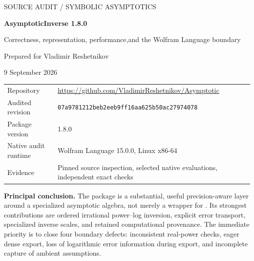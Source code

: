 \documentclass[11pt,a4paper]{article}
\newcommand{\code}[1]{\texttt{\detokenize{#1}}}
\begin{document}
\begin{titlepage}
\vspace*{17mm}
{\sffamily\large SOURCE AUDIT \; / \; SYMBOLIC ASYMPTOTICS\par}
\vspace{10mm}
{\sffamily\bfseries\fontsize{29}{34}\selectfont AsymptoticInverse 1.8.0\par}
\vspace{5mm}
{\sffamily\fontsize{18}{24}\selectfont Correctness, representation, performance,\newline and the Wolfram Language boundary\par}
\vspace{15mm}
{\large Prepared for Vladimir Reshetnikov\par}
{9 September 2026\par}
\vspace{10mm}
\begin{tabularx}{\textwidth}{@{}lY@{}}
Repository & \url{https://github.com/VladimirReshetnikov/Asymptotic}\\
Audited revision & \nolinkurl{07a9781212beb2eeb9ff16aa625b50ac27974078}\\
Package version & 1.8.0\\
Native audit runtime & Wolfram Language 15.0.0, Linux x86-64\\
Evidence & Pinned source inspection, selected native evaluations, independent exact checks\\
\end{tabularx}
\vfill
\textbf{Principal conclusion.} The package is a substantial, useful precision-aware layer around a specialized asymptotic algebra, not merely a wrapper for \code{Series}. Its strongest contributions are ordered irrational power--log inversion, explicit error transport, specialized inverse scales, and retained computational provenance. The immediate priority is to close four boundary defects: inconsistent real-power checks, eager dense export, loss of logarithmic error information during export, and incomplete capture of ambient assumptions.
\vspace{10mm}
\end{titlepage}
\end{document}
